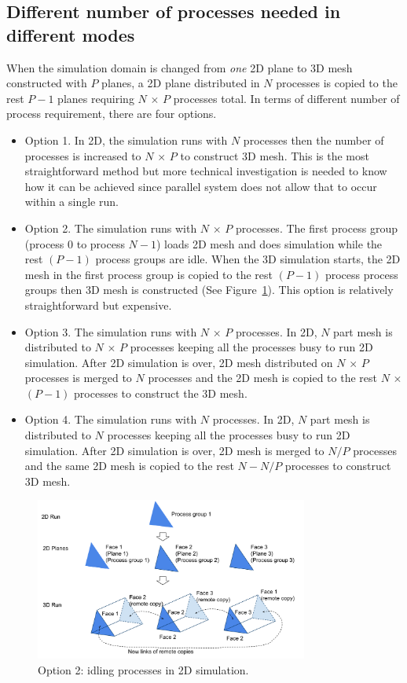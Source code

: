 \documentclass[11pt]{article}  %
\begin{document}
\subsection{Different number of processes needed in different modes}
When the simulation domain is changed from \emph{one} 2D plane to 3D mesh constructed with $P$ planes, a 2D plane distributed in $N$ processes is copied to the rest $P-1$ planes requiring $N$ $\times$ $P$ processes total. In terms of different number of process requirement, there are four options.
\begin{itemize}
\item{Option 1.} In 2D, the simulation runs with $N$ processes then the number of processes is increased to $N$ $\times$ $P$ to construct 3D mesh. This is the most straightforward method but more technical investigation is needed to know how it can be achieved since parallel system does not allow that to occur within a single run. 
\item{Option 2.} The simulation runs with $N$ $\times$ $P$ processes. The first process group (process $0$ to process $N-1$) loads 2D mesh and does simulation while the rest $(P-1)$ process groups are idle. When the 3D simulation starts, the 2D mesh in the first process group is copied to the rest $(P-1)$ process process groups then 3D mesh is constructed (See Figure~\ref{fig:wedgePlane}). This option is relatively straightforward but expensive.
\item{Option 3.} The simulation runs with $N$ $\times$ $P$ processes. In 2D, $N$ part mesh is distributed to $N$ $\times$ $P$ processes keeping all the processes busy to run 2D simulation. After 2D simulation is over, 2D mesh distributed on $N$ $\times$ $P$ processes is merged to $N$ processes and the 2D mesh is copied to the rest $N$ $\times$ $(P-1)$ processes to construct the 3D mesh. 
\item{Option 4.} The simulation runs with $N$ processes. In 2D, $N$ part mesh is distributed to $N$ processes keeping all the processes busy to run 2D simulation. After 2D simulation is over, 2D mesh is merged to $N/P$ processes and the same 2D mesh is copied to the rest $N-N/P$ processes to construct 3D mesh.  
\end{itemize}

\begin{figure}
\center
\includegraphics[width=0.8\textwidth]{fig/wedgePlane.png}
\caption{\small{Option 2: idling processes in 2D simulation.}} 
\label{fig:wedgePlane}
\end{figure}
\end{document}
